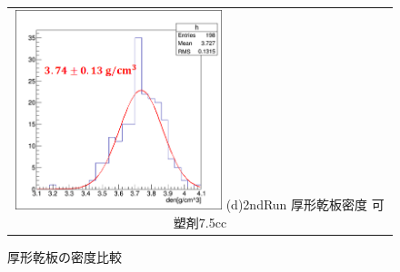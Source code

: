 \documentclass[12pt,a4paper]{jarticle}
\begin{document}
\begin{figure}[htbp]
\begin{tabular}{c}
        \begin{minipage}{0.5\hsize}
          \centering
              \includegraphics[clip, width=60mm]{2ndRun_thin_den.png}
              \hspace{1.6cm} (d)2ndRun 厚形乾板密度 可塑剤7.5cc
        \end{minipage}
    
      \end{tabular}
      \caption{厚形乾板の密度比較\label{fig:compare_thick_den}}
\end{figure}
\end{document}
